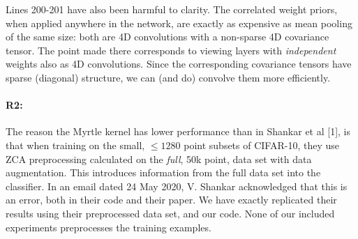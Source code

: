 \documentclass{article}
\begin{document}

Lines 200-201 have also been harmful to clarity. The correlated weight priors, when applied anywhere in the network, are exactly as expensive as mean pooling of the same size: both are 4D convolutions with a non-sparse 4D covariance tensor. The point made there corresponds to viewing layers with \emph{independent} weights also as 4D convolutions. Since the corresponding covariance tensors have sparse (diagonal) structure, we can (and do) convolve them more efficiently.

\vspace{-1.5ex}
\paragraph{R2:}

The reason the Myrtle kernel has lower performance than in Shankar et al [1], is that when training on the small, $\le 1280$ point subsets of CIFAR-10, they use ZCA preprocessing calculated on the \emph{full}, 50k point, data set with data augmentation. This introduces information from the full data set into the classifier.
In an email dated 24 May 2020, V. Shankar acknowledged that this is an error, both in their code and their paper. We have exactly replicated their results using their preprocessed data set, and our code. None of our included experiments preprocesses the training examples.
\end{document}
